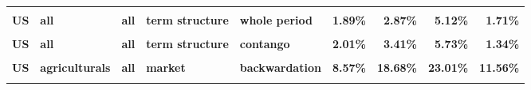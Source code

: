 \documentclass[
  authoryear,
  preprint,
  3p]{elsarticle}
\begin{document}
\begin{landscape}
\begin{longtable}[t]{>{}l>{}l>{}l>{}l>{}l>{}r>{}r>{}r>{}r}
\addlinespace
\textbf{\cellcolor{gray!10}{US}} & \textbf{\cellcolor{gray!10}{all}} & \textbf{\cellcolor{gray!10}{all}} & \textbf{\cellcolor{gray!10}{open interest nearby}} & \textbf{\cellcolor{gray!10}{contango}} & \textcolor[HTML]{4285f4}{\textbf{\cellcolor{gray!10}{7.95\%}}} & \textcolor[HTML]{4285f4}{\textbf{\cellcolor{gray!10}{7.61\%}}} & \textcolor[HTML]{4285f4}{\textbf{\cellcolor{gray!10}{5.24\%}}} & \textcolor[HTML]{4285f4}{\textbf{\cellcolor{gray!10}{5.82\%}}}\\
\textbf{US} & \textbf{all} & \textbf{all} & \textbf{term structure} & \textbf{whole period} & \textcolor[HTML]{4285f4}{\textbf{1.89\%}} & \textcolor[HTML]{4285f4}{\textbf{2.87\%}} & \textcolor[HTML]{4285f4}{\textbf{5.12\%}} & \textcolor[HTML]{4285f4}{\textbf{1.71\%}}\\
\textbf{\cellcolor{gray!10}{US}} & \textbf{\cellcolor{gray!10}{all}} & \textbf{\cellcolor{gray!10}{all}} & \textbf{\cellcolor{gray!10}{term structure}} & \textbf{\cellcolor{gray!10}{backwardation}} & \textcolor[HTML]{4285f4}{\textbf{\cellcolor{gray!10}{2.3\%}}} & \textcolor[HTML]{4285f4}{\textbf{\cellcolor{gray!10}{2.78\%}}} & \textcolor[HTML]{4285f4}{\textbf{\cellcolor{gray!10}{4.79\%}}} & \textcolor[HTML]{4285f4}{\textbf{\cellcolor{gray!10}{2.85\%}}}\\
\textbf{US} & \textbf{all} & \textbf{all} & \textbf{term structure} & \textbf{contango} & \textcolor[HTML]{4285f4}{\textbf{2.01\%}} & \textcolor[HTML]{4285f4}{\textbf{3.41\%}} & \textcolor[HTML]{4285f4}{\textbf{5.73\%}} & \textcolor[HTML]{4285f4}{\textbf{1.34\%}}\\
\textbf{\cellcolor{gray!10}{US}} & \textbf{\cellcolor{gray!10}{agriculturals}} & \textbf{\cellcolor{gray!10}{all}} & \textbf{\cellcolor{gray!10}{market}} & \textbf{\cellcolor{gray!10}{whole period}} & \textcolor[HTML]{4285f4}{\textbf{\cellcolor{gray!10}{9.08\%}}} & \textcolor[HTML]{4285f4}{\textbf{\cellcolor{gray!10}{16.04\%}}} & \textcolor[HTML]{4285f4}{\textbf{\cellcolor{gray!10}{25.99\%}}} & \textcolor[HTML]{4285f4}{\textbf{\cellcolor{gray!10}{12.07\%}}}\\
\addlinespace
\textbf{US} & \textbf{agriculturals} & \textbf{all} & \textbf{market} & \textbf{backwardation} & \textcolor[HTML]{4285f4}{\textbf{8.57\%}} & \textcolor[HTML]{4285f4}{\textbf{18.68\%}} & \textcolor[HTML]{4285f4}{\textbf{23.01\%}} & \textcolor[HTML]{4285f4}{\textbf{11.56\%}}\\
\textbf{\cellcolor{gray!10}{US}} & \textbf{\cellcolor{gray!10}{agriculturals}} & \textbf{\cellcolor{gray!10}{all}} & \textbf{\cellcolor{gray!10}{market}} & \textbf{\cellcolor{gray!10}{contango}} & \textcolor[HTML]{4285f4}{\textbf{\cellcolor{gray!10}{9.85\%}}} & \textcolor[HTML]{4285f4}{\textbf{\cellcolor{gray!10}{13.5\%}}} & \textcolor[HTML]{4285f4}{\textbf{\cellcolor{gray!10}{28.67\%}}} & \textcolor[HTML]{4285f4}{\textbf{\cellcolor{gray!10}{12.91\%}}}\\

\end{longtable}
\end{landscape}
\end{document}
